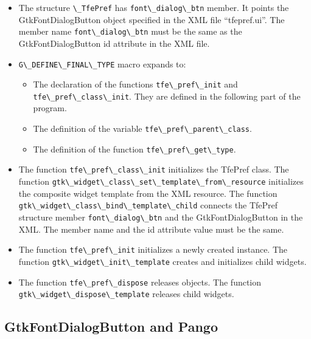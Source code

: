 \begin{itemize}
\tightlist
\item
  The structure \passthrough{\lstinline!\_TfePref!} has
  \passthrough{\lstinline!font\_dialog\_btn!} member. It points the
  GtkFontDialogButton object specified in the XML file ``tfepref.ui''.
  The member name \passthrough{\lstinline!font\_dialog\_btn!} must be
  the same as the GtkFontDialogButton id attribute in the XML file.
\item
  \passthrough{\lstinline!G\_DEFINE\_FINAL\_TYPE!} macro expands to:

  \begin{itemize}
  \tightlist
  \item
    The declaration of the functions
    \passthrough{\lstinline!tfe\_pref\_init!} and
    \passthrough{\lstinline!tfe\_pref\_class\_init!}. They are defined
    in the following part of the program.
  \item
    The definition of the variable
    \passthrough{\lstinline!tfe\_pref\_parent\_class!}.
  \item
    The definition of the function
    \passthrough{\lstinline!tfe\_pref\_get\_type!}.
  \end{itemize}
\item
  The function \passthrough{\lstinline!tfe\_pref\_class\_init!}
  initializes the TfePref class. The function
  \passthrough{\lstinline!gtk\_widget\_class\_set\_template\_from\_resource!}
  initializes the composite widget template from the XML resource. The
  function
  \passthrough{\lstinline!gtk\_widget\_class\_bind\_template\_child!}
  connects the TfePref structure member
  \passthrough{\lstinline!font\_dialog\_btn!} and the
  GtkFontDialogButton in the XML. The member name and the id attribute
  value must be the same.
\item
  The function \passthrough{\lstinline!tfe\_pref\_init!} initializes a
  newly created instance. The function
  \passthrough{\lstinline!gtk\_widget\_init\_template!} creates and
  initializes child widgets.
\item
  The function \passthrough{\lstinline!tfe\_pref\_dispose!} releases
  objects. The function
  \passthrough{\lstinline!gtk\_widget\_dispose\_template!} releases
  child widgets.
\end{itemize}

\subsection{GtkFontDialogButton and
Pango}\label{gtkfontdialogbutton-and-pango}

